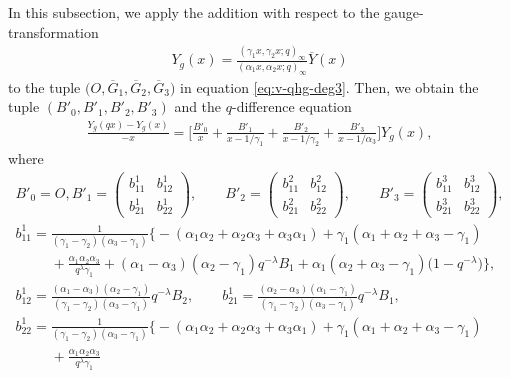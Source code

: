 \documentclass[pdftex]{sigma}
\numberwithin{equation}{section}
\theoremstyle{definition}
\begin{document}
In this subsection, we apply the addition with respect to the gauge-transformation
\begin{gather*}
 Y_g(x) = \frac{(\gamma_1 x, \gamma_2 x;q)_{\infty}}{(\alpha_1 x, \alpha_2 x;q)_{\infty}}\overline{Y}(x)
\end{gather*}
to the tuple $\bigl(O, \overline{G}_1, \overline{G}_2 , \overline{G}_3 \bigr) $ in equation \eqref{eq:v-qhg-deg3}.
Then, we obtain the tuple $(B'_0, B'_1, B'_2 , B'_3 )$ and the $q$-difference equation
\begin{gather*} %
\frac{Y_g(qx) - Y_g(x)}{-x} = \bigg[ \frac{B'_0}{x} + \frac{B'_1}{x-1/\gamma_1} + \frac{B'_2}{x-1/\gamma_2} + \frac{B'_3}{x-1/\alpha_3} \bigg] Y_g(x) ,
\end{gather*}
where
\begin{gather*}
B'_0 = O,
B'_1
= \begin{pmatrix}
 b^1_{11} & b^1_{12} \\
 b^1_{21} & b^1_{22}
 \end{pmatrix},\qquad
B'_2
= \begin{pmatrix}
 b^2_{11} & b^2_{12} \\
 b^2_{21} & b^2_{22}
 \end{pmatrix},\qquad
B'_3
= \begin{pmatrix}
 b^3_{11} & b^3_{12} \\
 b^3_{21} & b^3_{22}
 \end{pmatrix} , \\
 b^1_{11} = \frac{1}{(\gamma_1-\gamma_2)(\alpha_3-\gamma_1)}
\bigl\{ -(\alpha_1\alpha_2+\alpha_2\alpha_3+\alpha_3\alpha_1) + \gamma_1(\alpha_1+\alpha_2+\alpha_3-\gamma_1) \\
\phantom{b^1_{11} =}{} + \frac{\alpha_1\alpha_2\alpha_3}{q^{\lambda}\gamma_1}
+ (\alpha_1-\alpha_3)(\alpha_2-\gamma_1) q^{-\lambda} B_1 + \alpha_1(\alpha_2+\alpha_3-\gamma_1)\bigl(1-q^{-\lambda}\bigr) \bigr\}, \\
 b^1_{12} = \frac{(\alpha_1-\alpha_3)(\alpha_2-\gamma_1)}{(\gamma_1-\gamma_2)(\alpha_3-\gamma_1)} q^{-\lambda} B_2, \qquad b^1_{21} = \frac{(\alpha_2-\alpha_3)(\alpha_1-\gamma_1)}{(\gamma_1-\gamma_2)(\alpha_3-\gamma_1)} q^{-\lambda} B_1, \\
 b^1_{22} = \frac{1}{(\gamma_1-\gamma_2)(\alpha_3-\gamma_1)}
\bigl\{ -(\alpha_1\alpha_2+\alpha_2\alpha_3+\alpha_3\alpha_1) + \gamma_1(\alpha_1+\alpha_2+\alpha_3-\gamma_1) \\
\phantom{b^1_{22} =}{} + \frac{\alpha_1\alpha_2\alpha_3}{q^{\lambda}\gamma_1}

\end{gather*}
\end{document}
